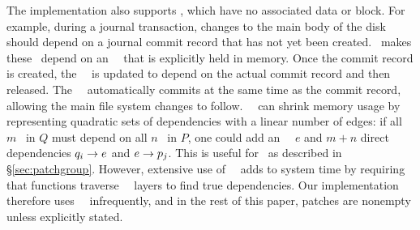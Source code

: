 The implementation also supports \emph{\noop} \patches, which have
 no associated data or block.
%
%
For example, during a journal transaction,
 changes to the main body of the disk should depend on a
 journal commit record that has not yet been created.
%
\Kudos\ makes these \patches\ depend on an \noop\ \patch\
 that is explicitly held in memory.
%
Once the commit record is created, the \noop\ \patch\ is updated to depend on
 the actual commit record and then released.
%
The \noop\ \patch\ automatically commits at the same time as the commit
 record, allowing the main file system changes to follow.
%
%
\Noop\ \patches\ can shrink memory usage by representing quadratic sets of
 dependencies with a linear number of edges: if all $m$ \patches\ in $Q$
 must depend on all $n$ \patches\ in $P$, one could
 add an \noop\ \patch\ $e$ and $m+n$ direct dependencies
 $q_i \rightarrow e$ and $e \rightarrow p_j$.
%
This is useful for \patchgroups\ as described in \S\ref{sec:patchgroup}.
%
However, extensive use of \noop\ \patches\ adds to system time by
 requiring that functions traverse \noop\ \patch\ layers to find true
 dependencies.
%
Our implementation therefore uses \noop\ \patches\ infrequently, and in the
 rest of this paper, patches are nonempty unless explicitly
 stated.


\begin{comment}
To solve this problem, we introduce an additional type of \patch. The
prototypical \patch\ corresponds to some change on disk, but \Kudos\ also
supports \aemphnoop\ \patch\ type, which doesn't change the disk at all.
\Noop\ \patches\ can have \befores, like other \patches, but they don't need to
be written to disk: they are trivially satisfied when all of their \befores\ are
satisfied. Thus, they can be used to ``stand for'' entire sets of other changes.
%
This capability is extremely useful, and is used by most operations on disk
structures so that a single \patch\ can be returned that depends on the whole
change. Likewise, \anoop\ \patch\ can be passed in as a parameter to a disk
operation to make the whole operation depend on a set of other changes. \Noop\
\patches\ allow dependencies between sets with only a linear number of
dependency edges in the \patch\ graph, and without having to pass around arrays
of \patches.
%
The cost is that some functions may have to traverse trees of \noop\ \patches\
to determine true dependencies.
\end{comment}
